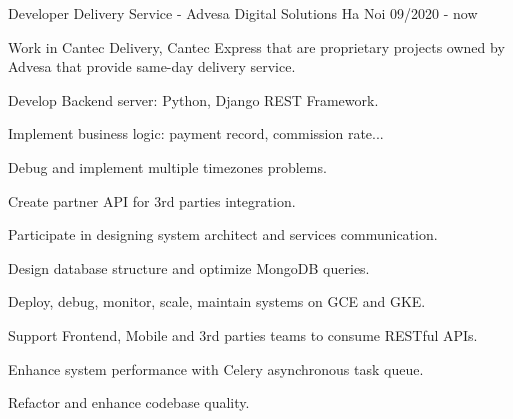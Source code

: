 \begin{cventries}
    \cventry
    {Developer} %
    {Delivery Service - Advesa Digital Solutions} %
    {Ha Noi} %
    {09/2020 - now} %
    {
        \begin{cvitems} %
            \item {Work in Cantec Delivery, Cantec Express that are proprietary projects owned by Advesa that provide same-day delivery service.}
            \item {Develop Backend server: Python, Django REST Framework.}
            \item {Implement business logic: payment record, commission rate...}
            \item {Debug and implement multiple timezones problems.}
            \item {Create partner API for 3rd parties integration.}
            \item {Participate in designing system architect and services communication.}
            \item {Design database structure and optimize MongoDB queries.}
            \item {Deploy, debug, monitor, scale, maintain systems on GCE and GKE.}
            \item {Support Frontend, Mobile and 3rd parties teams to consume RESTful APIs.}
            \item {Enhance system performance with Celery asynchronous task queue.}
            \item {Refactor and enhance codebase quality.}
        \end{cvitems}
    }

\end{cventries}
